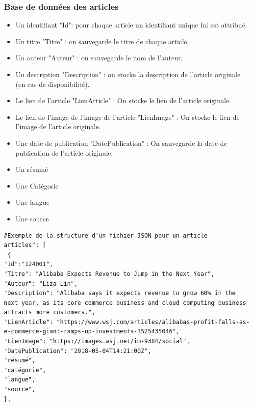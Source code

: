 \subsubsection{Base de données des articles}

\begin{itemize}
	
	\item Un identifiant "Id": pour chaque article un identifiant unique lui est attribué.\\
	
	\item Un titre "Titre" : on sauvegarde le titre de chaque article.\\
	
	\item Un auteur "Auteur" : on sauvegarde le nom de l'auteur.\\
	
	\item Un description "Description" : on stocke la description de l'article originale (en cas de disponibilité).\\
	
	\item Le lien de l'article "LienArticle" : On stocke le lien de l'article originale.\\
	
	\item Le lien de l'image de l'image de l'article "LienImage" : On stocke le lien de l'image de l'article originale.\\
	
	\item Une date de publication "DatePublication" : On sauvegarde la date de publication de l'article originale.\\
	
	\item Un résumé
	
	\item Une Catégorie
	
	\item Une langue
	
	\item Une source
	
	
\end{itemize}

\begin{lstlisting}[style=code]
#Exemple de la structure d'un fichier JSON pour un article
articles": [
-{
"Id":"124001",
"Titre": "Alibaba Expects Revenue to Jump in the Next Year",
"Auteur": "Liza Lin",
"Description": "Alibaba says it expects revenue to grow 60% in the next year, as its core commerce business and cloud computing business attracts more customers.",
"LienArticle": "https://www.wsj.com/articles/alibabas-profit-falls-as-e-commerce-giant-ramps-up-investments-1525435046",
"LienImage": "https://images.wsj.net/im-9384/social",
"DatePublication": "2018-05-04T14:21:00Z",
"résumé",
"catégorie",
"langue",
"source",
},

\end{lstlisting}

